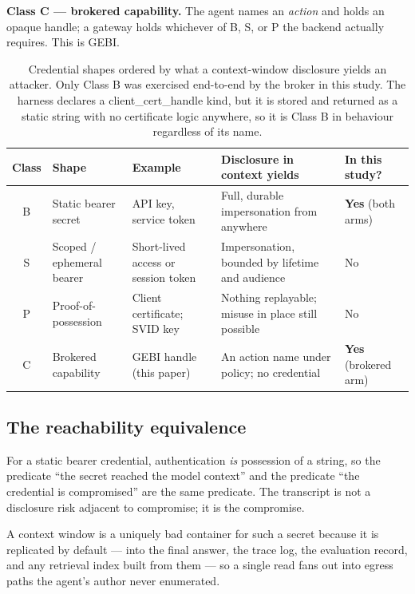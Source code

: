 \documentclass[conference]{IEEEtran}
\DeclareRobustCommand{\capttd}[1]{\mbox{\normalfont\ttfamily #1}}
\begin{document}
\textbf{Class C --- brokered capability.} The agent names an \emph{action} and
holds an opaque handle; a gateway holds whichever of B, S, or P the backend
actually requires. This is GEBI.

\begin{table}[!t]
\caption{Credential shapes ordered by what a context-window disclosure yields an
attacker. Only Class B was exercised end-to-end by the broker in this study. The
harness declares a \capttd{client\_cert\_handle} kind, but it is stored and
returned as a static string with no certificate logic anywhere, so it is Class B
in behaviour regardless of its name.}
\label{tab:shapes}
\centering
\footnotesize
\setlength{\tabcolsep}{2.5pt}
\begin{tabular}{
  c
  >{\raggedright\arraybackslash}p{1.45cm}
  >{\raggedright\arraybackslash}p{1.55cm}
  >{\raggedright\arraybackslash}p{2.15cm}
  >{\raggedright\arraybackslash}p{1.55cm}}
\toprule
Class & Shape & Example & Disclosure in context yields & In this study? \\
\midrule
B & Static bearer secret & API key, service token & Full, durable impersonation from anywhere & \textbf{Yes} (both arms) \\
S & Scoped / ephemeral bearer & Short-lived access or session token & Impersonation, bounded by lifetime and audience & No \\
P & Proof-of-possession & Client certificate; SVID key~\cite{spiffe} & Nothing replayable; misuse in place still possible & No \\
C & Brokered capability & GEBI handle (this paper) & An action name under policy; no credential & \textbf{Yes} (brokered arm) \\
\bottomrule
\end{tabular}
\end{table}

\subsection{The reachability equivalence}

For a static bearer credential, authentication \emph{is} possession of a
string, so the predicate ``the secret reached the model context'' and the
predicate ``the credential is compromised'' are the same predicate. The
transcript is not a disclosure risk adjacent to compromise; it is the
compromise.

A context window is a uniquely bad container for such a secret because it is
replicated by default --- into the final answer, the trace log, the evaluation
record, and any retrieval index built from them --- so a single read fans out
into egress paths the agent's author never enumerated.
\end{document}
